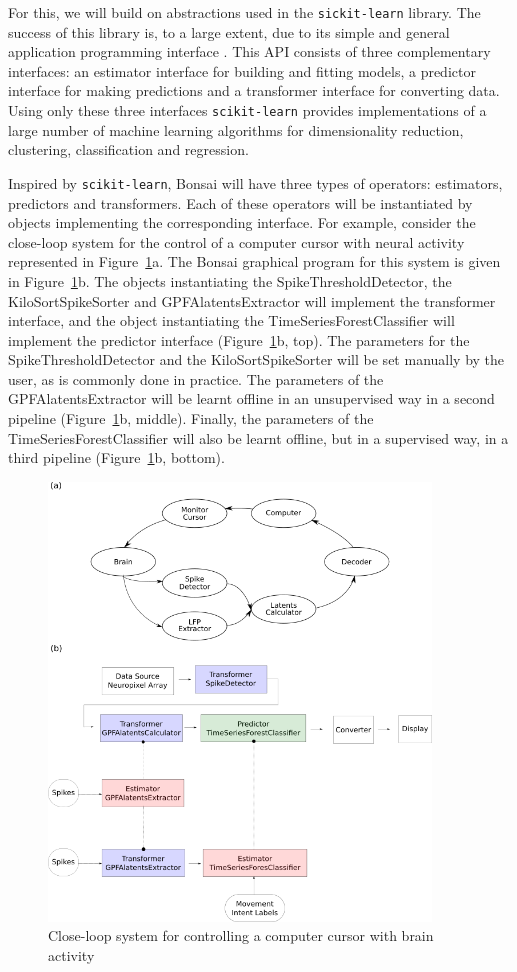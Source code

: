 \documentclass[a4paper,11point]{article}
\begin{document}
For this, we will build on abstractions used in the \texttt{sickit-learn}
library. The success of this library is, to a large extent, due to its simple
and general application programming interface \citep[API;][]{buitinckEtAl13}.
%
This API consists of three complementary interfaces: an estimator interface for
building and fitting models, a predictor interface for making predictions and a
transformer interface for converting data.
%
Using only these three interfaces \texttt{scikit-learn} provides
implementations of a large number of machine learning algorithms for
dimensionality reduction, clustering, classification and regression.

Inspired by \texttt{scikit-learn}, Bonsai will have three types of operators:
estimators, predictors and transformers. Each of these operators will be
instantiated by objects implementing the corresponding interface.
%
For example, consider the close-loop system for the control of a computer
cursor with neural activity represented in Figure~\ref{fig:bci}a. The Bonsai
graphical program for this system is given in Figure~\ref{fig:bci}b. The
objects instantiating the SpikeThresholdDetector, the KiloSortSpikeSorter and
GPFAlatentsExtractor will implement the transformer interface, and the object
instantiating the TimeSeriesForestClassifier will implement the predictor
interface (Figure~\ref{fig:bci}b, top).
%
The parameters for the SpikeThresholdDetector and the KiloSortSpikeSorter will
be set manually by the user, as is commonly done in practice. The parameters of
the GPFAlatentsExtractor will be learnt offline in an unsupervised way in a
second pipeline (Figure~\ref{fig:bci}b, middle). Finally, the parameters of the
TimeSeriesForestClassifier will also be learnt offline, but in a supervised
way, in a third pipeline (Figure~\ref{fig:bci}b, bottom).

\begin{figure}
   \begin{center}
       \includegraphics[width=4in]{figures/bci.png}
       \caption{Close-loop system for controlling a computer cursor with brain activity}
     \label{fig:bci}
   \end{center}
\end{figure}
\end{document}
